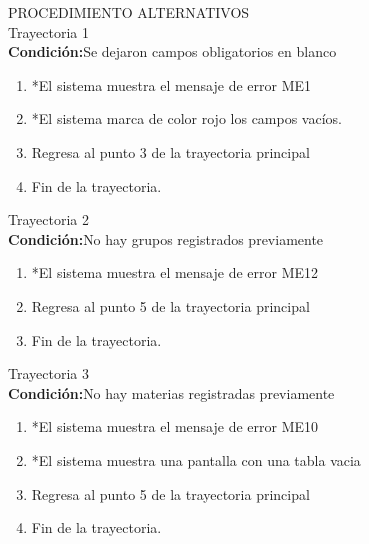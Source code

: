 \Large{PROCEDIMIENTO ALTERNATIVOS}\\
\large{}
Trayectoria 1\\
\textbf{Condición:}Se dejaron campos obligatorios en blanco
\large{}
\begin{enumerate}
    \item *El sistema muestra el mensaje de error ME1
    \item *El sistema marca de color rojo los campos vacíos.
    \item Regresa al punto 3 de la trayectoria principal
    \item Fin de la trayectoria.
\end{enumerate}

Trayectoria 2\\
\textbf{Condición:}No hay grupos registrados previamente
\large{}
\begin{enumerate}
    \item *El sistema muestra el mensaje de error ME12
    \item Regresa al punto 5 de la trayectoria principal
    \item Fin de la trayectoria.
\end{enumerate}

Trayectoria 3\\
\textbf{Condición:}No hay materias registradas previamente
\large{}
\begin{enumerate}
    \item *El sistema muestra el mensaje de error ME10
    \item *El sistema muestra una pantalla con una tabla vacia
    \item Regresa al punto 5 de la trayectoria principal
    \item Fin de la trayectoria.
\end{enumerate}